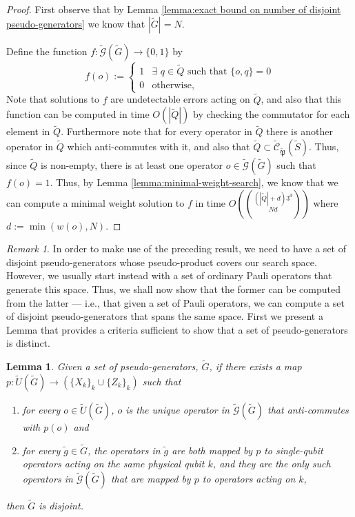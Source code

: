 \documentclass[12pt]{amsbook}
\theoremstyle{plain}
\newtheorem{lemma}{Lemma}
\theoremstyle{definition}
\theoremstyle{remark}
\newtheorem{remark}{Remark}
\newcommand{\set}{\tilde}
\newcommand{\genfun}{\tilde{\mathcal{G}}}
\newcommand{\pauligroup}{{\set{\mathfrak{P}}}}
\newcommand{\centralizer}{\set{\mathcal{C}}}
\newcommand{\paren}[1]{\left(#1\right)}
\begin{document}
\begin{proof}
First observe that by Lemma \ref{lemma:exact bound on number of disjoint pseudo-generators} we know that $|\set G|=N$.

Define the function $f:\genfun(\set G)\to\{0,1\}$ by
$$f(o):=
\begin{cases}
1 & \exists\,\, q\in\set Q \,\,\text{such that}\,\, \{o,q\}=0\\
0 & \text{otherwise},
\end{cases}
$$
Note that solutions to $f$ are undetectable errors acting on $\set Q$, and also that this function can be computed in time $O(|\set Q|)$ by checking the commutator for each element in $\set Q$.  Furthermore note that for every operator in $\set Q$ there is another operator in $\set Q$ which anti-commutes with it, and also that $\set Q\subset \centralizer_\pauligroup(\set S)$.  Thus, since $\set Q$ is non-empty, there is at least one operator $o\in\genfun(\set G)$ such that $f(o)=1$.  Thus, by Lemma \ref{lemma:minimal-weight-search}, we know that we can compute a minimal weight solution to $f$ in time $O\paren{(|\set Q|+d)3^d\choose{N}{d}}$ where $d:=\min\paren{w(o),N}$.
\end{proof}
\begin{remark}
In order to make use of the preceding result, we need to have a set of disjoint pseudo-generators whose pseudo-product covers our search space.  However, we usually start instead with a set of ordinary Pauli operators that generate this space.  Thus, we shall now show that the former can be computed from the latter --- i.e., that given a set of Pauli operators, we can compute a set of disjoint pseudo-generators that spans the same space.  First we present a Lemma that provides a criteria sufficient to show that a set of pseudo-generators is distinct.
\end{remark}

\begin{lemma}
\label{lemma:disjointness-equvalence}
Given a set of pseudo-generators, $\set G$, if there exists a map $p:\set U(\set G)\to \paren{\{X_k\}_k \cup \{Z_k\}_k}$ such that
\begin{enumerate}
\item for every $o\in\set U(\set G)$, $o$ is the unique operator in $\genfun(\set G)$ that anti-commutes with $p(o)$ and
\item for every $\set g\in\set G$, the operators in $\set g$ are both mapped by $p$ to single-qubit operators acting on the same physical qubit $k$, and they are the only such operators in $\genfun(\set G)$ that are mapped by $p$ to operators acting on $k$,
\end{enumerate}
then $\set G$ is disjoint.
\end{lemma}
\end{document}

